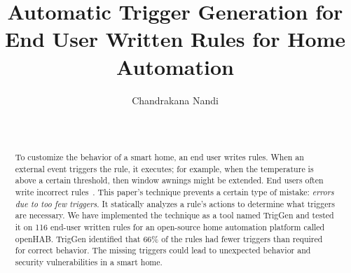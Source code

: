 \documentclass{sig-alternate-05-2015}
\begin{document}


\title{Automatic Trigger Generation for End User Written Rules for Home Automation}
%
%
%
%
%

%
\author{
\alignauthor
Chandrakana Nandi\\
	\\
       \\
}

\maketitle
\begin{abstract}
To customize the behavior of a smart home, an end user writes rules.
When an external event triggers the rule, it executes; for example, when
the temperature is above a certain threshold, then window awnings might be extended.
End users often write incorrect rules~\cite{Huang}.
This paper's technique prevents a certain type of mistake:  
\textit{errors due to too few triggers}.
It statically analyzes a rule's actions to determine what triggers are necessary. We have implemented the technique as a tool named TrigGen and tested it on 116 end-user written rules for an open-source home automation platform called openHAB.
TrigGen identified that 66\% of the rules had fewer triggers than required
for correct behavior.
The missing triggers could lead to unexpected behavior
and security vulnerabilities in a smart home.
\end{abstract}
\end{document}
